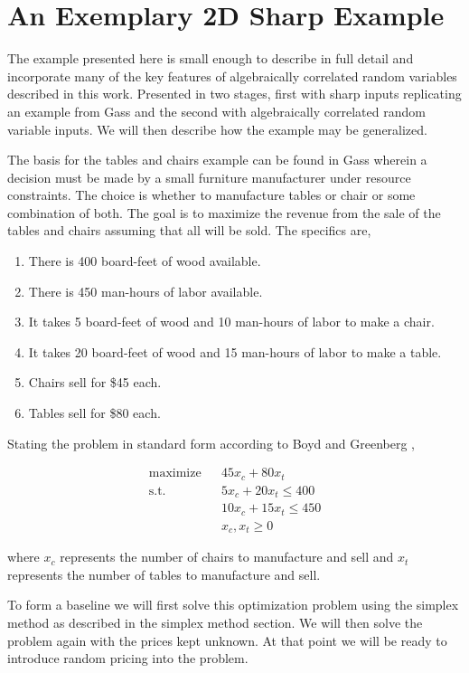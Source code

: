 \section{An Exemplary 2D Sharp Example}

The example presented here is small enough to describe in full detail and incorporate many of the key features of algebraically correlated random variables described in this work. Presented in two stages, first with sharp inputs replicating an example from Gass \cite{gass75} and the second with algebraically correlated random variable inputs. We will then describe how the example may be generalized.

The basis for the tables and chairs example can be found in Gass \cite{gass75} wherein a decision must be made by a small furniture manufacturer under resource constraints. The choice is whether to manufacture tables or chair or some combination of both. The goal is to maximize the revenue from the sale of the tables and chairs assuming that all will be sold. The specifics are,

\begin{enumerate}
\item There is 400 board-feet of wood available.
\item There is 450 man-hours of labor available.
\item It takes 5 board-feet of wood and 10 man-hours of labor to make a chair.
\item It takes 20 board-feet of wood and 15 man-hours of labor to make a table.
\item Chairs sell for \$45 each.
\item Tables sell for \$80 each.
\end{enumerate}

Stating the problem in standard form according to Boyd \cite{boyd04}
and Greenberg \cite{greenberg95},

\begin{align*}
\text{maximize} && 45 x_c + 80 x_t\\
\text{s.t.}     && 5 x_c + 20 x_t \le 400\\
                && 10 x_c + 15 x_t \le 450\\
                && x_c, x_t \ge 0
\end{align*}

where $x_c$ represents the number of chairs to manufacture and sell
and $x_t$ represents the number of tables to manufacture and sell.

To form a baseline we will first solve this optimization problem using
the simplex method as described in the simplex method section. We will
then solve the problem again with the prices kept unknown. At that
point we will be ready to introduce random pricing into the problem.

